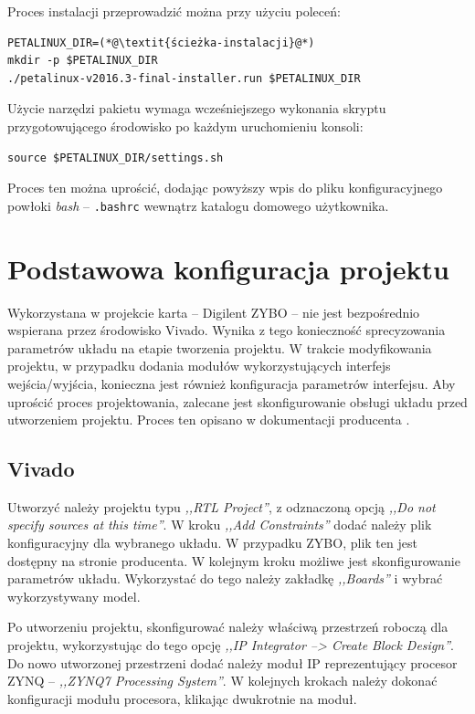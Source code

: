 Proces instalacji przeprowadzić można przy użyciu poleceń:
\begin{lstlisting}[breaklines]
PETALINUX_DIR=(*@\textit{ścieżka-instalacji}@*)
mkdir -p $PETALINUX_DIR
./petalinux-v2016.3-final-installer.run $PETALINUX_DIR
\end{lstlisting}

Użycie narzędzi pakietu wymaga wcześniejszego wykonania skryptu przygotowującego środowisko po każdym uruchomieniu konsoli:
\begin{lstlisting}[breaklines]
source $PETALINUX_DIR/settings.sh
\end{lstlisting}

Proces ten można uprościć, dodając powyższy wpis do pliku konfiguracyjnego powłoki \emph{bash} -- \texttt{.bashrc} wewnątrz katalogu domowego użytkownika.

\section{Podstawowa konfiguracja projektu}
\label{sec:basic-proj-config}
Wykorzystana w projekcie karta -- Digilent ZYBO -- nie jest bezpośrednio wspierana przez środowisko Vivado.
Wynika z tego konieczność sprecyzowania parametrów układu na etapie tworzenia projektu. 
W trakcie modyfikowania projektu, w przypadku dodania modułów wykorzystujących interfejs wejścia/wyjścia, konieczna jest również konfiguracja parametrów interfejsu. 
Aby uprościć proces projektowania, zalecane jest skonfigurowanie obsługi układu przed utworzeniem projektu. 
Proces ten opisano w dokumentacji producenta \cite{zybo-in-vivado}.

\subsection{Vivado}
\label{sec:vivado-conf}
Utworzyć należy projektu typu \emph{,,RTL Project''}, z odznaczoną opcją \emph{,,Do not specify sources at this time''}.
W kroku \emph{,,Add Constraints''} dodać należy plik konfiguracyjny dla wybranego układu. 
W przypadku ZYBO, plik ten jest dostępny na stronie producenta. 
W kolejnym kroku możliwe jest skonfigurowanie parametrów układu. 
Wykorzystać do tego należy zakładkę \emph{,,Boards''} i wybrać wykorzystywany model.

Po utworzeniu projektu, skonfigurować należy właściwą przestrzeń roboczą dla projektu, wykorzystując do tego opcję \emph{,,IP Integrator --> Create Block Design''}.
Do nowo utworzonej przestrzeni dodać należy moduł IP reprezentujący procesor ZYNQ -- \emph{,,ZYNQ7 Processing System''}.
W kolejnych krokach należy dokonać konfiguracji modułu procesora, klikając dwukrotnie na moduł.

